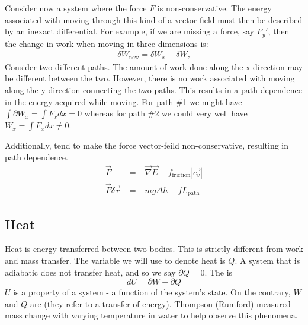 \documentclass[12pt]{article}
\begin{document}
  Consider now a system where the force $F$ is non-conservative.  The energy associated with moving through this kind of a vector field must then be described by an inexact differential.  For example, if we are missing a force, say $F_y'$, then the change in work when moving in three dimensions is:
\begin{align*}
\delta W_\text{new} = \delta W_x + \delta W_z
\end{align*}
Consider two different paths.  The amount of work done along the x-direction may be different between the two.  However, there is no work associated with moving along the y-direction connecting the two paths.  This results in a path dependence in the energy acquired while moving.  For path \#1 we might have $\int \partial W_x = \int F_x dx = 0$ whereas for path \#2 we could very well have $W_x = \int F_x dx \neq 0$.  

Additionally,  tend to make the force vector-feild non-conservative, resulting in path dependence.
\begin{align*}
\vec{F} &= -\vec{\nabla}\vec{E} - f_\text{friction} | \vec{e_v}|\\
\vec{F}\delta\vec{r} &= -mg\Delta h- f L_\text{path}
\end{align*} 

\subsection{Heat}
Heat is energy transferred between two bodies.  This is strictly different from work and mass transfer.  The variable we will use to denote heat is $Q$.  A system that is adiabatic does not transfer heat, and so we say $\partial Q = 0$.  The  is
\begin{equation}\boxed{
dU = \partial W + \partial Q
}\end{equation}
$U$ is a property of a system - a function of the system's state.  On the contrary, $W$ and $Q$ are  (they refer to a transfer of energy).  Thompson (Rumford) measured mass change with varying temperature in water to help observe this phenomena.
\end{document}
